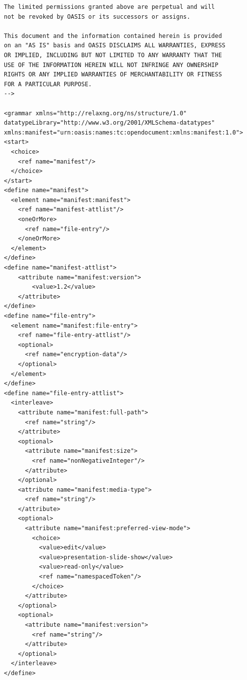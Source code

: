 \documentclass[11pt,oneside]{fithesis2}
\begin{document}
\begin{appendix}
\begin{lstlisting}
The limited permissions granted above are perpetual and will 
not be revoked by OASIS or its successors or assigns.

This document and the information contained herein is provided 
on an "AS IS" basis and OASIS DISCLAIMS ALL WARRANTIES, EXPRESS
OR IMPLIED, INCLUDING BUT NOT LIMITED TO ANY WARRANTY THAT THE
USE OF THE INFORMATION HEREIN WILL NOT INFRINGE ANY OWNERSHIP
RIGHTS OR ANY IMPLIED WARRANTIES OF MERCHANTABILITY OR FITNESS 
FOR A PARTICULAR PURPOSE. 
-->

<grammar xmlns="http://relaxng.org/ns/structure/1.0"
datatypeLibrary="http://www.w3.org/2001/XMLSchema-datatypes"
xmlns:manifest="urn:oasis:names:tc:opendocument:xmlns:manifest:1.0">
<start>
  <choice>
    <ref name="manifest"/>
  </choice>
</start>
<define name="manifest">
  <element name="manifest:manifest">
    <ref name="manifest-attlist"/>
    <oneOrMore>
      <ref name="file-entry"/>
    </oneOrMore>
  </element>
</define>
<define name="manifest-attlist">
	<attribute name="manifest:version">
		<value>1.2</value>
	</attribute>
</define>
<define name="file-entry">
  <element name="manifest:file-entry">
    <ref name="file-entry-attlist"/>
    <optional>
      <ref name="encryption-data"/>
    </optional>
  </element>
</define>
<define name="file-entry-attlist">
  <interleave>
    <attribute name="manifest:full-path">
      <ref name="string"/>
    </attribute>
    <optional>
      <attribute name="manifest:size">
        <ref name="nonNegativeInteger"/>
      </attribute>
    </optional>
    <attribute name="manifest:media-type">
      <ref name="string"/>
    </attribute>
    <optional>
      <attribute name="manifest:preferred-view-mode">
        <choice>
          <value>edit</value>
          <value>presentation-slide-show</value>
          <value>read-only</value>
          <ref name="namespacedToken"/> 
        </choice> 
      </attribute> 
    </optional> 
    <optional>
      <attribute name="manifest:version">
        <ref name="string"/>
      </attribute>
    </optional>
  </interleave>
</define>


\end{lstlisting}
\end{appendix}
\end{document}
